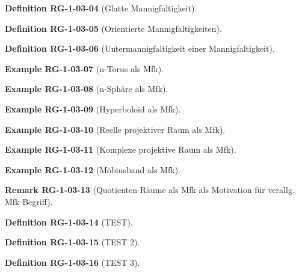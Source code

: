 \documentclass[10pt, letterpaper]{article}
\newcommand{\CustomHeading}[3]{%
  \par\medskip\noindent%
  \textbf{#1 #2} \textnormal{(#3)}.\enskip%
}
\newenvironment{DEF}[2]{\CustomHeading{Definition}{#1}{#2}}{}
\newenvironment{REM}[2]{\CustomHeading{Remark}{#1}{#2}}{}
\newenvironment{EXA}[2]{\CustomHeading{Example}{#1}{#2}}{}
\begin{document}
\begin{DEF}{RG-1-03-04}{Glatte Mannigfaltigkeit}
\end{DEF}

\begin{DEF}{RG-1-03-05}{Orientierte Mannigfaltigkeiten}
\end{DEF}

\begin{DEF}{RG-1-03-06}{Untermannigfaltigkeit einer Mannigfaltigkeit}
\end{DEF}

\begin{EXA}{RG-1-03-07}{n-Torus als Mfk}
\end{EXA}

\begin{EXA}{RG-1-03-08}{n-Sphäre als Mfk}
\end{EXA}

\begin{EXA}{RG-1-03-09}{Hyperboloid als Mfk}
\end{EXA}

\begin{EXA}{RG-1-03-10}{Reelle projektiver Raum als Mfk}
\end{EXA}

\begin{EXA}{RG-1-03-11}{Komplexe projektive Raum als Mfk}
\end{EXA}

\begin{EXA}{RG-1-03-12}{Möbiusband als Mfk}
\end{EXA}

\begin{REM}{RG-1-03-13}{Quotienten-Räume als Mfk als Motivation für verallg. Mfk-Begriff}
\end{REM}

\begin{DEF}{RG-1-03-14}{TEST}
\end{DEF}

\begin{DEF}{RG-1-03-15}{TEST 2}
\end{DEF}

\begin{DEF}{RG-1-03-16}{TEST 3}
\end{DEF}
\end{document}
